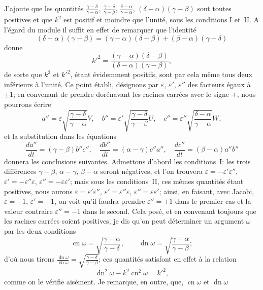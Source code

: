 \documentclass[11pt,leqno,oneside,letterpaper]{book}[2005/09/16]
\DeclareMathOperator{\cn}{cn}
\DeclareMathOperator{\dn}{dn}
\begin{document}
J'ajoute que les quantit\'es
$\frac{\gamma-\delta}{\gamma-\alpha}$,
$\frac{\gamma-\delta}{\gamma- \beta}$,
$\frac{\delta-\alpha}{\gamma-\alpha}$,
$(\delta-\alpha)(\gamma-\beta)$ sont toutes
positives et que $k^2$ est positif et moindre que l'unit\'e, sous les conditions
I et~II. A l'\'egard du module il suffit en effet de remarquer que l'identit\'e
\[
  (\delta-\alpha)(\gamma- \beta)
= (\gamma-\alpha)(\delta- \beta)
+ ( \beta-\alpha)(\gamma-\delta)
\]
donne
\[
k'^2 = \frac{(\gamma-\alpha)(\delta-\beta)}{(\delta-\alpha)(\gamma-\beta)},
\]
de sorte que $k^2$ et $k'^2$, \'etant \'evidemment positifs, sont par cela m\^eme tous
deux inf\'erieurs \`a l'unit\'e. Ce point \'etabli, d\'esignons par
$\varepsilon$, $\varepsilon'$, $\varepsilon''$ des facteurs
\'egaux \`a $\pm 1$; en convenant de prendre dor\'enavant les racines carr\'ees avec
le signe $+$, nous pourrons \'ecrire
\[
  a'' = \varepsilon  \sqrt{\frac{\gamma-\delta}{\gamma-\alpha}}V,\quad
  b'' = \varepsilon' \sqrt{\frac{\gamma-\delta}{\gamma-\beta }}U,\quad
  c'' = \varepsilon''\sqrt{\frac{\delta-\alpha}{\gamma-\alpha}}W,
\]
et la substitution dans les \'equations
\[
  \frac{da''}{dt} = (\gamma-\beta ) b''c'',\quad
  \frac{db''}{dt} = (\alpha-\gamma) c''a'',\quad
  \frac{dc''}{dt} = (\beta -\alpha) a''b''
\]
donnera les conclusions suivantes. Admettons d'abord les conditions~I: les
trois diff\'erences $\gamma-\beta$, $\alpha-\gamma$, $\beta-\alpha$ seront n\'egatives, et l'on trouvera
$\varepsilon  = -\varepsilon' \varepsilon''$,
$\varepsilon' = -\varepsilon''\varepsilon  $,
$\varepsilon''= -\varepsilon  \varepsilon'$;
mais sous les conditions~II, ces m\^emes
quantit\'es \'etant positives, nous aurons
$\varepsilon  = \varepsilon' \varepsilon''$,
$\varepsilon' = \varepsilon''\varepsilon  $,
$\varepsilon''= \varepsilon  \varepsilon' $; ainsi, en
faisant, avec Jacobi,
$\varepsilon = -1$, $\varepsilon' = +1$, on voit qu'il faudra prendre
$\varepsilon'' = +1$ dans le premier cas et la valeur contraire $\varepsilon'' = -1$ dans le second.
Cela pos\'e, et en convenant toujours que les racines carr\'ees soient
positives, je dis qu'on peut d\'eterminer un argument $\omega$ par les deux conditions\label{page26}
\[
  \cn\omega = \sqrt{\frac{\gamma-\alpha}{\gamma-\delta}},\qquad
  \dn\omega = \sqrt{\frac{\gamma-\alpha}{\gamma-\beta }};
\]
d'o\`u nous tirons
$\frac{\dn\omega}{\cn\omega} = \sqrt{\frac{\gamma-\delta}{\gamma-\beta}}$;
ces quantit\'es satisfont en effet \`a la relation
\[
  \dn^2\omega - k^2\cn^2\omega = k'^2,
\]
comme on le v\'erifie ais\'ement. Je remarque, en outre, que, $\cn\omega$ et $\dn\omega$
\end{document}
